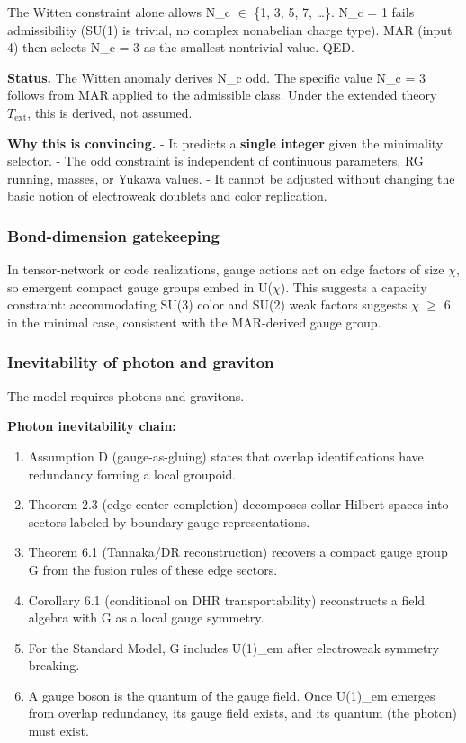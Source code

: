 \documentclass[11pt,a4paper]{article}
\theoremstyle{remark}
\providecommand{\tightlist}{%
  \setlength{\itemsep}{0pt}\setlength{\parskip}{0pt}}
\begin{document}
The Witten constraint alone allows N\_c \ensuremath{\in} \{1, 3, 5, 7, \ldots\}. N\_c = 1
fails admissibility (SU(1) is trivial, no complex nonabelian charge type).
MAR (input 4) then selects N\_c = 3 as the smallest nontrivial value. QED.

\textbf{Status.} The Witten anomaly derives N\_c odd. The specific value N\_c = 3
follows from MAR applied to the admissible class. Under the extended theory
\(T_{\mathrm{ext}}\), this is derived, not assumed.

\textbf{Why this is convincing.}
- It predicts a \textbf{single integer} given the minimality selector.
- The odd constraint is independent of continuous parameters, RG running,
masses, or Yukawa values.
- It cannot be adjusted without changing the basic notion of electroweak
doublets and color replication.

\subsubsection{Bond-dimension gatekeeping}\label{bond-dimension-gatekeeping}

In tensor-network or code realizations, gauge actions act on edge factors of
size \ensuremath{\chi}, so emergent compact gauge groups embed in U(\ensuremath{\chi}). This suggests a
capacity constraint: accommodating SU(3) color and SU(2) weak factors suggests
\ensuremath{\chi} \ensuremath{\geq} 6 in the minimal case, consistent with the MAR-derived gauge group.

\subsubsection{Inevitability of photon and graviton}\label{inevitability-of-photon-and-graviton}

The model requires photons and gravitons.

\textbf{Photon inevitability chain:}

\begin{enumerate}
\def\labelenumi{\arabic{enumi}.}
\tightlist
\item
  Assumption D (gauge-as-gluing) states that overlap identifications have
  redundancy forming a local groupoid.
\item
  Theorem 2.3 (edge-center completion) decomposes collar Hilbert spaces into
  sectors labeled by boundary gauge representations.
\item
  Theorem 6.1 (Tannaka/DR reconstruction) recovers a compact gauge group G
  from the fusion rules of these edge sectors.
\item
  Corollary 6.1 (conditional on DHR transportability) reconstructs a field
  algebra with G as a local gauge symmetry.
\item
  For the Standard Model, G includes U(1)\_em after electroweak symmetry
  breaking.
\item
  A gauge boson is the quantum of the gauge field. Once U(1)\_em emerges from
  overlap redundancy, its gauge field exists, and its quantum (the photon) must
  exist.
\end{enumerate}
\end{document}
